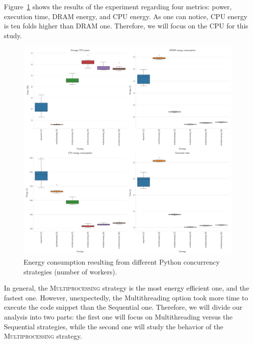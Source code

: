 Figure~\ref{fig:python_multiprocessing} shows the results of the experiment regarding four metrics: power, execution time, DRAM energy, and CPU energy.
As one can notice, CPU energy is ten folds higher than DRAM one.
Therefore, we will focus on the CPU for this study.

\begin{figure}[!hbt]
    \centering
    \includegraphics[width=\linewidth]{imgs/python_multiprocessing}
    \caption{Energy consumption resulting from different Python concurrency strategies (number of workers).}
    \label{fig:python_multiprocessing}
\end{figure}

In general, the \textsc{Multiprocessing} strategy is the most energy efficient one, and the fastest one.
However, unexpectedly, the \textsf{Multithreading} option took more time to execute the code snippet than the \textsf{Sequential} one.
Therefore, we will divide our analysis into two parts: the first one will focus on \textsf{Multithreading} versus the \textsf{Sequential} strategies, while the second one will study the behavior of the \textsc{Multiprocessing} strategy.

